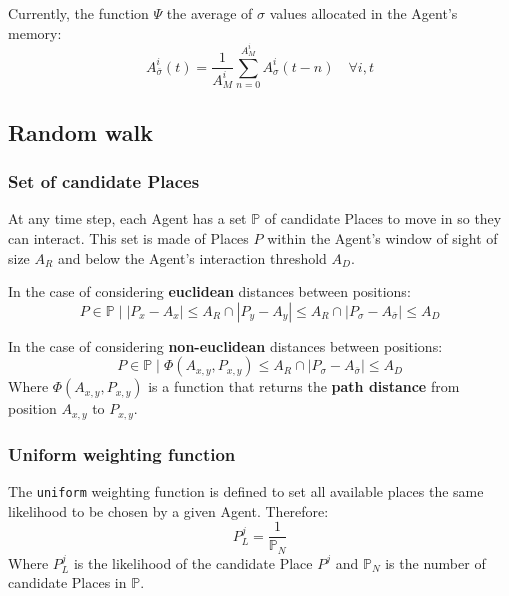 \documentclass{article}
\begin{document}
Currently, the function $\Psi$ the average of $\sigma$ values allocated in the Agent's memory:
\begin{equation}
    A^{i}_{\bar{\sigma}}(t) = \frac{1}{A^{i}_{M}} \sum_{n=0}^{A^{i}_{M}} A^{i}_{\sigma}(t - n) \quad \forall i, t
\end{equation}

\subsection{Random walk}

\subsubsection{Set of candidate Places}

\par At any time step, each Agent has a set $\mathbb{P}$ of candidate Places to move in so they can interact. This set is made of Places $P$ within the Agent's window of sight of size $A_{R}$ and below the Agent's interaction threshold $A_{D}$. 

\par In the case of considering \textbf{euclidean} distances between positions:
\begin{equation}
    P \in \mathbb{P} \;\big|\;|P_{x} - A_{x}| \leq A_{R} \cap |P_{y} - A_{y}| \leq A_{R} \cap |P_{\sigma} - A_{\bar{\sigma}}| \leq A_{D} 
\end{equation}

\par In the case of considering \textbf{non-euclidean} distances between positions:
\begin{equation}
    P \in \mathbb{P} \;\big|\; \Phi(A_{x,y},P_{x,y}) \leq A_{R} \cap |P_{\sigma} - A_{\bar{\sigma}}| \leq A_{D} 
\end{equation}
Where $\Phi(A_{x,y},P_{x,y})$ is a function that returns the \textbf{path distance} from position $A_{x,y}$ to $P_{x,y}$. 

\subsubsection{Uniform weighting function}

\par The \texttt{uniform} weighting function is defined to set all available places the same likelihood to be chosen by a given Agent. Therefore:
\begin{equation}
    P^{j}_L = \frac{1}{{\mathbb{P}_N}} 
\end{equation}
Where $P^{j}_L$ is the likelihood of the candidate Place $P^{j}$ and ${\mathbb{P}_N}$ is the number of candidate Places in $\mathbb{P}$.
\end{document}
